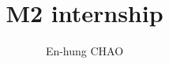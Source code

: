 \documentclass[11pt, oneside]{report}   	%
\title{M2 internship}
\author{En-hung CHAO}
\theoremstyle{remark}
\begin{document}
\let\clearpage\relax



\tableofcontents




%
%
%
%
%
%
%
%
%
%


%



\end{document}
